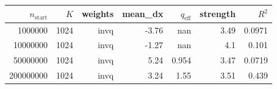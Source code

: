 \begin{tabular}{r r r r r r r}
\hline
$n_{\mathrm{start}}$ & $K$ & weights & mean\_dx & $q_{\mathrm{eff}}$ & strength & $R^2$ \\
\hline
1000000 & 1024 & invq & -3.76 & nan & 3.49 & 0.0971 \\
10000000 & 1024 & invq & -1.27 & nan & 4.1 & 0.101 \\
50000000 & 1024 & invq & 5.24 & 0.954 & 3.47 & 0.0719 \\
200000000 & 1024 & invq & 3.24 & 1.55 & 3.51 & 0.439 \\
\hline
\end{tabular}
